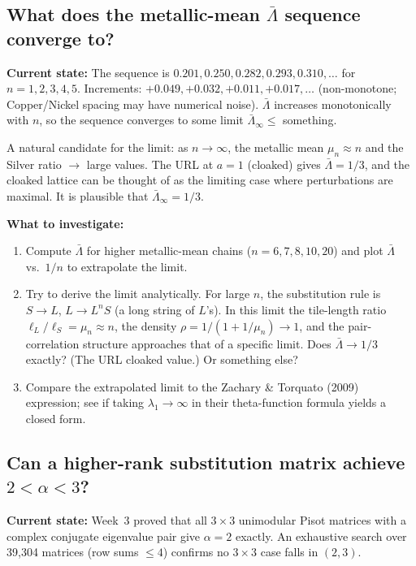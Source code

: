 \documentclass[11pt,letterpaper]{article}
\begin{document}
\subsection{What does the metallic-mean $\bar\Lambda$ sequence converge to?}

\textbf{Current state:}
The sequence is $0.201, 0.250, 0.282, 0.293, 0.310, \ldots$ for $n=1,2,3,4,5$.
Increments: $+0.049, +0.032, +0.011, +0.017, \ldots$ (non-monotone; Copper/Nickel spacing
may have numerical noise). $\bar\Lambda$ increases monotonically with $n$, so the sequence
converges to some limit $\bar\Lambda_\infty \leq$ something.

A natural candidate for the limit: as $n\to\infty$, the metallic mean $\mu_n\approx n$
and the Silver ratio $\to$ large values. The URL at $a=1$ (cloaked) gives $\bar\Lambda=1/3$,
and the cloaked lattice can be thought of as the limiting case where perturbations are maximal.
It is plausible that $\bar\Lambda_\infty = 1/3$.

\textbf{What to investigate:}
\begin{enumerate}[leftmargin=2em]
  \item Compute $\bar\Lambda$ for higher metallic-mean chains ($n=6,7,8,10,20$) and plot
    $\bar\Lambda$ vs.\ $1/n$ to extrapolate the limit.
  \item Try to derive the limit analytically. For large $n$, the substitution rule is
    $S\to L$, $L\to L^n S$ (a long string of $L$'s). In this limit the tile-length ratio
    $\ell_L/\ell_S = \mu_n \approx n$, the density $\rho = 1/(1+1/\mu_n)\to 1$,
    and the pair-correlation structure approaches that of a specific limit.
    Does $\bar\Lambda \to 1/3$ exactly? (The URL cloaked value.) Or something else?
  \item Compare the extrapolated limit to the Zachary \& Torquato (2009) expression;
    see if taking $\lambda_1\to\infty$ in their theta-function formula yields a closed form.
\end{enumerate}

\subsection{Can a higher-rank substitution matrix achieve $2 < \alpha < 3$?}

\textbf{Current state:}
Week~3 proved that all $3\times3$ unimodular Pisot matrices with a complex conjugate
eigenvalue pair give $\alpha=2$ exactly. An exhaustive search over 39,304 matrices (row
sums $\leq4$) confirms no $3\times3$ case falls in $(2,3)$.
\end{document}
